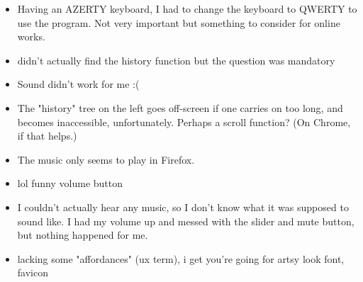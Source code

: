 \begin{itemize}
    \item Having an AZERTY keyboard, I had to change the keyboard to QWERTY to
        use the program. Not very important but something to consider for online
        works.

    \item didn't actually find the history function but the question was
        mandatory

    \item Sound didn't work for me :(

    \item The "history" tree on the left goes off-screen if one carries on too
        long, and becomes inaccessible, unfortunately. Perhaps a scroll
        function? (On Chrome, if that helps.)

    \item The music only seems to play in Firefox.

    \item lol funny volume button

    \item I couldn't actually hear any music, so I don't know what it was
        supposed to sound like. I had my volume up and messed with the slider
        and mute button, but nothing happened for me.

    \item lacking some "affordances" (ux term), i get you're going for artsy
        look font, favicon
\end{itemize}

